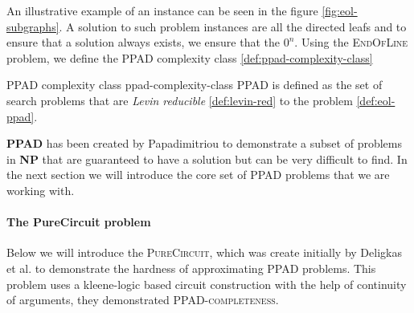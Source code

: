 An illustrative example of an instance can be seen in the figure \ref{fig:eol-subgraphs}. A solution
to such problem instances are all the directed leafs and to ensure that a solution always
exists, we ensure that the $0^n$. Using the \textsc{EndOfLine} problem, we define the
\textsc{PPAD} complexity class \ref{def:ppad-complexity-class}


\begin{definitionbox}{\textsc{PPAD} complexity class \cite{papadimitriou_ComplexityParityArgument_1994}}{ppad-complexity-class}
    \textsc{PPAD} is defined as the set of search problems that
    are \textit{Levin reducible} \ref{def:levin-red} to the  problem \ref{def:eol-ppad}.
\end{definitionbox}

\textbf{PPAD} has been created by Papadimitriou \cite{papadimitriou_ComplexityParityArgument_1994}
to demonstrate a subset of problems in \textbf{NP} that are guaranteed to have
a solution but can be very difficult to find. In the next section
we will introduce the core set of \textsc{PPAD} problems that we are working with.

\paragraph{The PureCircuit problem}

Below we will introduce the
\textsc{PureCircuit}, which was create initially by
Deligkas et al. \cite{deligkas_PureCircuitTightInapproximability_2024}
to demonstrate the hardness of approximating \textsc{PPAD} problems.
This problem uses a kleene-logic based circuit construction with the help
of continuity of arguments, they demonstrated \textsc{PPAD-completeness}.

